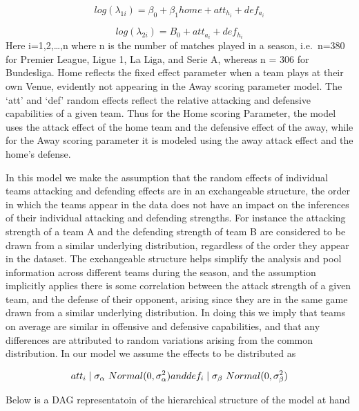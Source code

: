 \documentclass[
]{article}
\begin{document}
\[log(\lambda_{1i}) = \beta_0 + \beta_1 home + att_{h_i} + def_{a_i}  \]

\[log(\lambda_{2i}) =  B_0 + att_{a_i} + def_{h_i}\] Here i=1,2,\ldots,n
where n is the number of matches played in a season, i.e.~n=380 for
Premier League, Ligue 1, La Liga, and Serie A, whereas n = 306 for
Bundesliga. Home reflects the fixed effect parameter when a team plays
at their own Venue, evidently not appearing in the Away scoring
parameter model. The `att' and `def' random effects reflect the relative
attacking and defensive capabilities of a given team. Thus for the Home
scoring Parameter, the model uses the attack effect of the home team and
the defensive effect of the away, while for the Away scoring parameter
it is modeled using the away attack effect and the home's defense.

In this model we make the assumption that the random effects of
individual teams attacking and defending effects are in an exchangeable
structure, the order in which the teams appear in the data does not have
an impact on the inferences of their individual attacking and defending
strengths. For instance the attacking strength of a team A and the
defending strength of team B are considered to be drawn from a similar
underlying distribution, regardless of the order they appear in the
dataset. The exchangeable structure helps simplify the analysis and pool
information across different teams during the season, and the assumption
implicitly applies there is some correlation between the attack strength
of a given team, and the defense of their opponent, arising since they
are in the same game drawn from a similar underlying distribution. In
doing this we imply that teams on average are similar in offensive and
defensive capabilities, and that any differences are attributed to
random variations arising from the common distribution. In our model we
assume the effects to be distributed as

\[att_i \mid \sigma_\alpha ~ Normal(0, \sigma^2_\alpha) \\ and \\ def_i \mid \sigma_\beta ~ Normal(0, \sigma^2_\beta)\]

Below is a DAG representatoin of the hierarchical structure of the model
at hand
\end{document}
